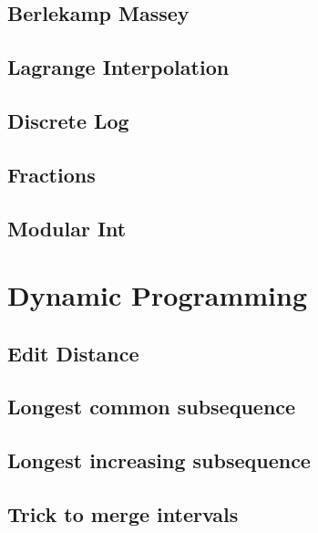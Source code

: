\subsection{Berlekamp Massey}
\raggedbottom
\hrulefill
\subsection{Lagrange Interpolation}
\raggedbottom
\hrulefill
\subsection{Discrete Log}
\raggedbottom
\hrulefill
\subsection{Fractions}
\raggedbottom
\hrulefill
\subsection{Modular Int}
\raggedbottom
\hrulefill

\section{Dynamic Programming}
\subsection{Edit Distance}
\raggedbottom
\hrulefill
\subsection{Longest common subsequence}
\raggedbottom
\hrulefill
\subsection{Longest increasing subsequence}
\raggedbottom
\hrulefill
\subsection{Trick to merge intervals}
\raggedbottom
\hrulefill
